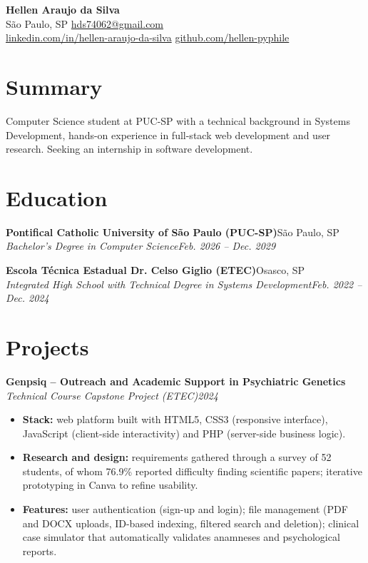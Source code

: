 \documentclass[letterpaper,11pt]{article}
\newcommand{\entry}[4]{%
  \vspace{3pt}
  \noindent\textbf{#1}\hfill #2\\
  \textit{#3}\hfill\textit{#4}\par
}
\begin{document}
\begin{center}
  {\LARGE\bfseries Hellen Araujo da Silva}\\[4pt]
  São Paulo, SP \textbar{} \href{mailto:hds74062@gmail.com}{hds74062@gmail.com} \\
  \href{https://www.linkedin.com/in/hellen-araujo-da-silva-550b86322/}{linkedin.com/in/hellen-araujo-da-silva}
  \textbar{} \href{https://github.com/hellen-pyphile}{github.com/hellen-pyphile}
\end{center}

\section{Summary}
Computer Science student at PUC-SP with a technical background in Systems Development,
hands-on experience in full-stack web development and user research.
Seeking an internship in software development.

\section{Education}
\entry{Pontifical Catholic University of São Paulo (PUC-SP)}{São Paulo, SP}
  {Bachelor's Degree in Computer Science}{Feb. 2026 -- Dec. 2029}
\entry{Escola Técnica Estadual Dr. Celso Giglio (ETEC)}{Osasco, SP}
  {Integrated High School with Technical Degree in Systems Development}{Feb. 2022 -- Dec. 2024}

\section{Projects}
\entry{Genpsiq -- Outreach and Academic Support in Psychiatric Genetics}{}
  {Technical Course Capstone Project (ETEC)}{2024}
\begin{itemize}
  \item \textbf{Stack:} web platform built with HTML5, CSS3 (responsive interface),
        JavaScript (client-side interactivity) and PHP (server-side business logic).
  \item \textbf{Research and design:} requirements gathered through a survey of
        52 students, of whom 76.9\% reported difficulty finding scientific
        papers; iterative prototyping in Canva to refine usability.
  \item \textbf{Features:} user authentication (sign-up and login); file management
        (PDF and DOCX uploads, ID-based indexing, filtered search and deletion);
        clinical case simulator that automatically validates anamneses and
        psychological reports.
\end{itemize}
\end{document}
